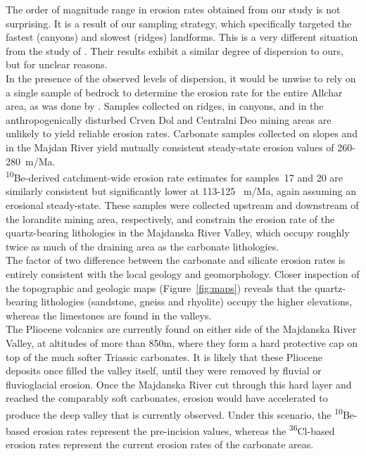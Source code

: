 \documentclass[titlepage]{article}
\begin{document}
The order of magnitude range in erosion rates obtained from our study
is not surprising. It is a result of our sampling strategy, which
specifically targeted the fastest (canyons) and slowest (ridges)
landforms. This is a very different situation from the study of
\citet{pavicevic2016}. Their results exhibit a similar degree of
dispersion to ours, but for unclear reasons.\\

In the presence of the observed levels of dispersion, it would be
unwise to rely on a single sample of bedrock to determine the erosion
rate for the entire Allchar area, as was done by \citet{dockhorn1991}.
Samples collected on ridges, in canyons, and in the anthropogenically
disturbed Crven Dol and Centralni Deo mining areas are unlikely to
yield reliable erosion rates. Carbonate samples collected on slopes
and in the Majdan River yield mutually consistent steady-state erosion
values of 260-280~m/Ma.\\

\textsuperscript{10}Be-derived catchment-wide erosion rate estimates
for samples~17 and 20 are similarly consistent but significantly lower
at 113-125 ~m/Ma, again assuming an erosional steady-state.  These
samples were collected upstream and downstream of the lorandite mining
area, respectively, and constrain the erosion rate of the
quartz-bearing lithologies in the Majdanska River Valley, which occupy
roughly twice as much of the draining area as the carbonate
lithologies.\\

The factor of two difference between the carbonate and silicate
erosion rates is entirely consistent with the local geology and
geomorphology.  Closer inspection of the topographic and geologic maps
(Figure~\ref{fig:maps}) reveals that the quartz-bearing lithologies
(sandstone, gneiss and rhyolite) occupy the higher elevations, whereas
the limestones are found in the valleys.\\

The Pliocene volcanics are currently found on either side of the
Majdanska River Valley, at altitudes of more than 850m, where they
form a hard protective cap on top of the much softer Triassic
carbonates. It is likely that these Pliocene deposits once filled the
valley itself, until they were removed by fluvial or fluvioglacial
erosion. Once the Majdanska River cut through this hard layer and
reached the comparably soft carbonates, erosion would have accelerated
to produce the deep valley that is currently observed.  Under this
scenario, the \textsuperscript{10}Be-based erosion rates represent the
pre-incision values, whereas the \textsuperscript{36}Cl-based erosion
rates represent the current erosion rates of the carbonate areas.\\
\end{document}
